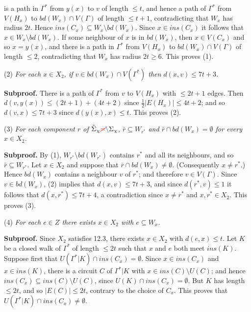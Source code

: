 \noindent is a path in $\Gamma^*$ from $y(x)$ to $v$ of length $\le t$, and hence a path of $\Gamma^*$ from $V(H_x)$ to $bd(W_x) \cap V(\Gamma)$ of length $\le t+1$, contradicting that $W_x$ has radius $2t$. Hence $ins(C_x) \subseteq W_x \setminus bd(W_x)$. Since $x \in ins(C_x)$ it follows that $x \in W_x \setminus bd(W_x)$. If some neighbour of $x$ is in $bd(W_x)$, then $x \in V(C_x)$ and so $x = y(x)$, and there is a path in $\Gamma^*$ from $V(H_x)$ to $bd(W_x) \cap V(\Gamma)$ of length $\le 2$, contradicting that $W_x$ has radius $2t \ge 6$. This proves (1).

\hspace*{12pt}(2) \textit{For each $x \in X_2$, if $v \in bd(W_x) \cap V(\Gamma^*)$ then $d(x, v) \le 7t + 3$.}

\textbf{Subproof.} There is a path of $\Gamma^*$ from $v$ to $V(H_x)$ with $\le 2t + 1$ edges. Then $d(v, y(x)) \le (2t + 1) + (4t + 2)$ since $\frac{1}{2}|E(H_x)| \le 4t + 2$; and so $d(v, x) \le 7t + 3$ since $d(y(x), x) \le t$. This proves (2).

\hspace*{12pt}(3) \textit{For each component $r$ of $\hat{\Sigma}_\chi \delm{=}\fix{\setminus} \Sigma_\chi$, $\bar{r} \subseteq W_{r^*}$ and $\bar{r} \cap bd(W_x) = \emptyset$ for every $x \in X_2$.}

\textbf{Subproof.} By (1), $W_{r^*} \setminus bd(W_{r^*})$ contains $r^*$ and all its neighbours, and so $\bar{r} \subseteq W_{r^*}$. Let $x \in X_2$ and suppose that $\bar{r} \cap bd(W_x) \ne \emptyset$. (Consequently $x \ne r^*$.) Hence $bd(W_x)$ contains a neighbour $v$ of $r^*$; and therefore $v \in V(\Gamma)$. Since $v \in bd(W_x)$, (2) implies that $d(x, v) \le 7t + 3$, and since $d(r^*, v) \le 1$ it follows that $d(x, r^*) \le 7t + 4$, a contradiction since $x \ne r^*$ and $x, r^* \in X_2$. This proves (3).

\hspace*{12pt}(4) \textit{For each $e \in Z$ there exists $x \in X_2$ with $e \subseteq W_x$.}

\textbf{Subproof.} Since $X_2$ satisfies 12.3, there exists $x \in X_2$ with $d(e, x) \le t$. Let $K$ be a closed walk of $\Gamma^*$ of length $\le 2t$ such that $x$ and $e$ both meet $ins(K)$. Suppose first that $U(\Gamma^* | K) \cap ins(C_x) = \emptyset$. Since $x \in ins(C_x)$ and $x \in ins(K)$, there is a circuit $C$ of $\Gamma^* | K$ with $x \in ins(C) \setminus U(C)$; and hence $ins(C_x) \subseteq ins(C) \setminus U(C)$, since $U(K) \cap ins(C_x) = \emptyset$. But $K$ has length $\le 2t$, and so $|E(C)| \le 2t$, contrary to the choice of $C_x$. This proves that $U(\Gamma^* | K) \cap ins(C_x) \ne \emptyset$.

